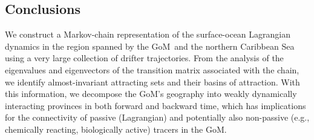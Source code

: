 \documentclass[final]{beamer}
\newcommand{\gom}{GoM}
\begin{document}
\begin{frame}[t]
\begin{multicols}{3}
\section{Conclusions}
We construct a Markov-chain representation of the surface-ocean Lagrangian dynamics in the region spanned by the \gom\ and the northern Caribbean Sea using a very large collection of drifter trajectories. From the analysis of the eigenvalues and eigenvectors of the transition matrix associated with the chain, we identify almost-invariant attracting sets and their basins of attraction. With this information, we decompose the GoM's geography into weakly dynamically interacting provinces in both forward and backward time, which has implications for the connectivity of passive (Lagrangian) and potentially also non-passive (e.g., chemically reacting, biologically active) tracers in the \gom. 



\begingroup
\renewcommand{\section}[2]{}%
\small{}
\endgroup
\vspace{0.5cm}
\end{multicols}
\end{frame}
\end{document}
